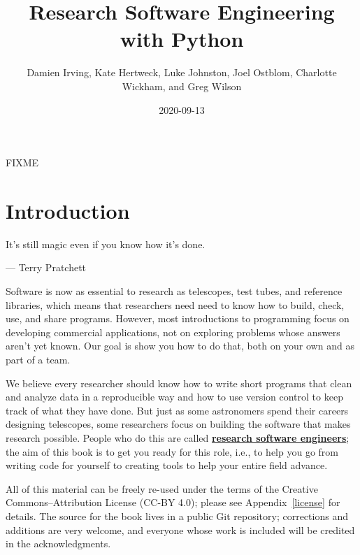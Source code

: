 \documentclass[
]{krantz}
\title{Research Software Engineering with Python}
\author{Damien Irving, Kate Hertweck, Luke Johnston, Joel Ostblom, Charlotte Wickham, and Greg Wilson}
\date{2020-09-13}
\renewenvironment{quote}{\begin{VF}}{\end{VF}}
\newcommand{\gref}[2]{\hyperlink{#2}{\textbf{#1}}}
\begin{document}
\maketitle


\thispagestyle{empty}

\begin{center}
FIXME
\end{center}

\setlength{\abovedisplayskip}{-5pt}
\setlength{\abovedisplayshortskip}{-5pt}

{
\setcounter{tocdepth}{1}
\tableofcontents
}
\listoffigures
\mainmatter

\hypertarget{intro}{%
\chapter{Introduction}\label{intro}}

\begin{quote}
It's still magic even if you know how it's done.

--- Terry Pratchett
\end{quote}

Software is now as essential to research as telescopes, test tubes, and reference libraries,
which means that researchers need need to know how to build, check, use, and share programs.
However,
most introductions to programming focus on developing commercial applications,
not on exploring problems whose answers aren't yet known.
Our goal is show you how to do that,
both on your own and as part of a team.

We believe every researcher should know
how to write short programs that clean and analyze data in a reproducible way
and how to use version control to keep track of what they have done.
But just as some astronomers spend their careers designing telescopes,
some researchers focus on building the software that makes research possible.
People who do this are called \gref{research software engineers}{rse};
the aim of this book is to get you ready for this role,
i.e.,
to help you go from writing code for yourself
to creating tools to help your entire field advance.

All of this material can be freely re-used
under the terms of the Creative Commons--Attribution License (CC-BY 4.0);
please see Appendix~\ref{license} for details.
The source for the book lives in a public Git repository;
corrections and additions are very welcome,
and everyone whose work is included will be credited in the acknowledgments.
\end{document}
